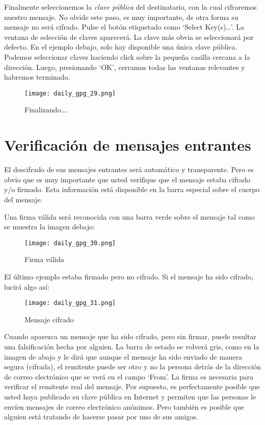 \documentclass[10pt,a5paper,twoside,,]{book}
\begin{document}
Finalmente seleccionemos la \emph{clave pública} del destinatario, con
la cual cifraremos nuestro mensaje. No olvide este paso, es muy
importante, de otra forma su mensaje no será cifrado. Pulse el botón
etiquetado como `Select Key(s)\ldots{}'. La ventana de selección de
claves aparecerá. La clave más obvia se seleccionará por defecto. En el
ejemplo debajo, solo hay disponible una única clave pública. Podemos
seleccionar claves haciendo click sobre la pequeña casilla cercana a la
dirección. Luego, presionando `OK', cerramos todas las ventanas
relevantes y habremos terminado.

\begin{figure}[htbp]
\centering
\texttt{[image: daily\_gpg\_29.png]}
\caption{Finalizando\ldots{}.}
\end{figure}

\section{Verificación de mensajes
entrantes}\label{verificaciuxf3n-de-mensajes-entrantes}

El descifrado de sus mensajes entrantes será automático y transparente.
Pero es obvio que es muy importante que usted verifique que el mensaje
estaba cifrado y/o firmado. Esta información está disponible en la barra
especial sobre el cuerpo del mensaje.

Una firma válida será reconocida con una barra verde sobre el mensaje
tal como se muestra la imagen debajo:

\begin{figure}[htbp]
\centering
\texttt{[image: daily\_gpg\_30.png]}
\caption{Firma válida}
\end{figure}

El último ejemplo estaba firmado pero no cifrado. Si el mensaje ha sido
cifrado, lucirá algo así:

\begin{figure}[htbp]
\centering
\texttt{[image: daily\_gpg\_31.png]}
\caption{Mensaje cifrado}
\end{figure}

Cuando aparezca un mensaje que ha sido cifrado, pero sin firmar, puede
resultar una falsificación hecha por alguien. La barra de estado se
volverá gris, como en la imagen de abajo y le dirá que aunque el mensaje
ha sido enviado de manera segura (cifrada), el remitente puede ser otro
y no la persona detrás de la dirección de correo electrónico que se verá
en el campo `From'. La firma es necesaria para verificar el remitente
real del mensaje. Por supuesto, es perfectamente posible que usted haya
publicado su clave pública en Internet y permiten que las personas le
envíen mensajes de correo electrónico anónimos. Pero también es posible
que alguien está tratando de hacerse pasar por uno de sus amigos.
\end{document}
